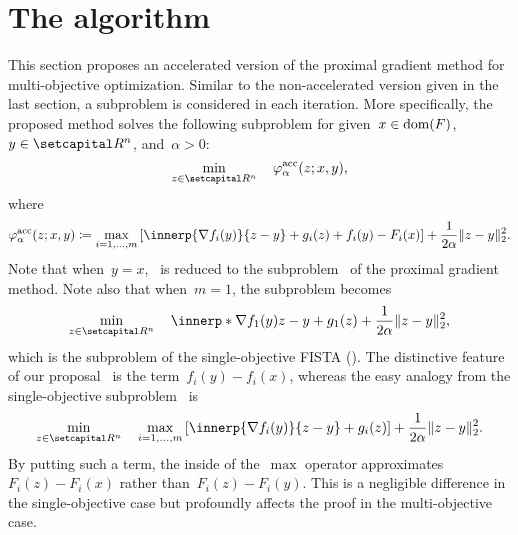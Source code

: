 \documentclass[../main]{subfiles}
\begin{document}
\section{The algorithm} 
This section proposes an accelerated version of the proximal gradient method for multi-objective optimization.
Similar to the non-accelerated version given in the last section, a subproblem is considered in each iteration.
More specifically, the proposed method solves the following subproblem for given~$x \in \operatorname{dom}(F)$,~$y \in \setR^n$, and~$\alpha > 0$:
\begin{equation} \label{eq:acc_pgm_subprob}
    \min_{z \in \setR^n} \quad \varphi^\acc_\alpha(z; x, y) 
,\end{equation}
where
\begin{equation} \label{eq:acc_pgm_obj}
    \varphi^\acc_\alpha(z; x, y) \coloneqq \max_{i = 1, \dots, m} \left[ \innerp{\nabla f_i(y)}{z - y} + g_i(z) + f_i(y) - F_i(x) \right] + \frac{1}{2 \alpha} \norm{z - y}_2^2
.\end{equation}
Note that when~$y = x$,~ is reduced to the subproblem~ of the proximal gradient method.
Note also that when~$m = 1$, the subproblem becomes
\begin{equation} \label{eq:single_fista_subprob}
    \min_{z \in \setR^n} \quad \innerp*{\nabla f_1(y)}{z - y} + g_1(z) + \frac{1}{2 \alpha} \norm{z - y}_2^2
,\end{equation}
which is the subproblem of the single-objective FISTA ().
The distinctive feature of our proposal~ is the term~$f_i(y) - f_i(x)$, whereas the easy analogy from the single-objective subproblem~ is
\begin{equation}
    \min_{z \in \setR^n} \quad \max_{i = 1, \dots, m} \left[ \innerp{\nabla f_i(y)}{z - y} + g_i(z) \right] + \frac{1}{2 \alpha} \norm{z - y}_2^2
.\end{equation} 
By putting such a term, the inside of the~$\max$ operator approximates~$F_i(z) - F_i(x)$ rather than~$F_i(z) - F_i(y)$.
This is a negligible difference in the single-objective case but profoundly affects the proof in the multi-objective case.
\end{document}
